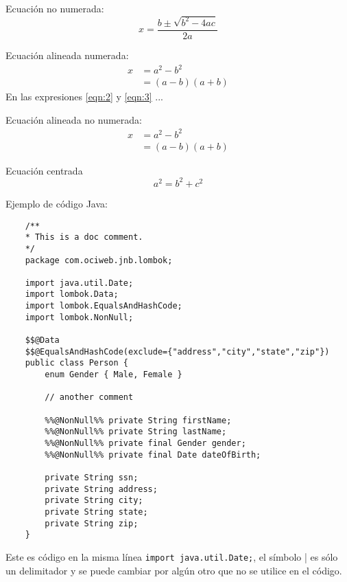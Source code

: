 \documentclass[fleqn]{Paquetes/RevDigMatEduInt}
\begin{document}
Ecuación no numerada:
\begin{equation*}
	x=\frac{b\pm \sqrt{b^2-4ac}}{2a}
\end{equation*}

Ecuación alineada numerada:
\begin{align}
	x & = a^2-b^2 \label{eqn:2}\\
	& = (a-b)(a+b) \label{eqn:3}
\end{align}
En las expresiones \ref{eqn:2} y \ref{eqn:3} ...

Ecuación alineada no numerada:
\begin{align*}
	x & = a^2-b^2 \\
	& = (a-b)(a+b)
\end{align*}

Ecuación centrada \[ a^2=b^2+c^2 \]


Ejemplo de código Java:

\begin{lstlisting}
	/**
	* This is a doc comment.
	*/
	package com.ociweb.jnb.lombok;
	
	import java.util.Date;
	import lombok.Data;
	import lombok.EqualsAndHashCode;
	import lombok.NonNull;
	
	$$@Data
	$$@EqualsAndHashCode(exclude={"address","city","state","zip"})
	public class Person {
		enum Gender { Male, Female }
		
		// another comment
		
		%%@NonNull%% private String firstName;
		%%@NonNull%% private String lastName;
		%%@NonNull%% private final Gender gender;
		%%@NonNull%% private final Date dateOfBirth;
		
		private String ssn;
		private String address;
		private String city;
		private String state;
		private String zip;
	}
\end{lstlisting}

Este es código en la misma línea \lstinline|import java.util.Date;|, el símbolo | es sólo un delimitador y se puede cambiar por algún otro que no se utilice en el código.


\end{document}
